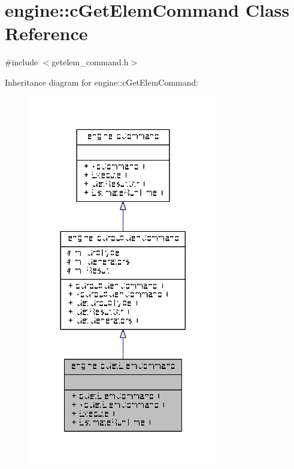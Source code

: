 \hypertarget{classengine_1_1cGetElemCommand}{\section{engine\-:\-:c\-Get\-Elem\-Command Class Reference}
\label{classengine_1_1cGetElemCommand}
}


{\ttfamily \#include $<$getelem\-\_\-command.\-h$>$}



Inheritance diagram for engine\-:\-:c\-Get\-Elem\-Command\-:
\nopagebreak
\begin{figure}[H]
\begin{center}
\leavevmode
\includegraphics[width=236pt]{classengine_1_1cGetElemCommand__inherit__graph}
\end{center}
\end{figure}


